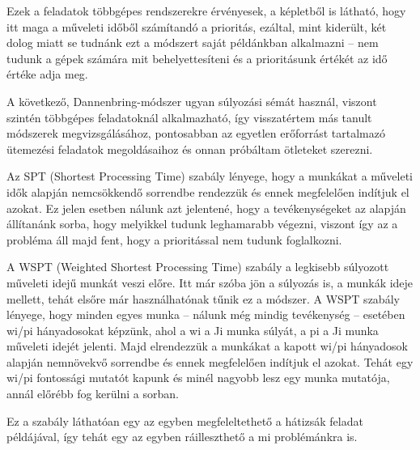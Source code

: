 
Ezek a feladatok többgépes rendszerekre érvényesek, a képletből is látható, hogy itt maga a műveleti időből számítandó a prioritás, ezáltal, mint kiderült, két dolog miatt se tudnánk ezt a módszert saját példánkban alkalmazni – nem tudunk a gépek számára mit behelyettesíteni és a prioritásunk értékét az idő értéke adja meg.



A következő, Dannenbring-módszer ugyan súlyozási sémát használ, viszont szintén többgépes feladatoknál alkalmazható, így visszatértem más tanult módszerek megvizsgálásához, pontosabban az egyetlen erőforrást tartalmazó ütemezési feladatok megoldásaihoz és onnan próbáltam ötleteket szerezni.


Az SPT (Shortest Processing Time) szabály lényege, hogy a munkákat a műveleti idők alapján nemcsökkendő sorrendbe rendezzük és ennek megfelelően indítjuk el azokat. Ez jelen esetben nálunk azt jelentené, hogy a tevékenységeket az alapján állítanánk sorba, hogy melyikkel tudunk leghamarabb végezni, viszont így az a probléma áll majd fent, hogy a prioritással nem tudunk foglalkozni.



A WSPT (Weighted Shortest Processing Time) szabály a legkisebb súlyozott műveleti idejű munkát veszi előre. Itt már szóba jön a súlyozás is, a munkák ideje mellett, tehát elsőre már használhatónak tűnik ez a módszer. A WSPT szabály lényege, hogy minden egyes munka – nálunk még mindig tevékenység – esetében wi/pi hányadosokat képzünk, ahol a wi a Ji munka súlyát, a pi a Ji munka műveleti idejét jelenti. Majd elrendezzük a munkákat a kapott wi/pi hányadosok alapján nemnövekvő sorrendbe és ennek megfelelően indítjuk el azokat.  Tehát egy wi/pi fontossági mutatót kapunk és minél nagyobb lesz egy munka mutatója, annál előrébb fog kerülni a sorban.

Ez a szabály láthatóan egy az egyben megfeleltethető a hátizsák feladat példájával, így tehát egy az egyben ráilleszthető a mi problémánkra is.
